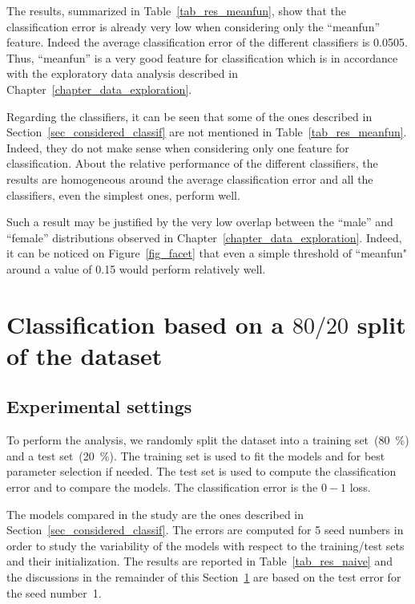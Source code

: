 The results, summarized in Table~\ref{tab_res_meanfun}, show that the classification error is already very low when considering only the ``meanfun'' feature. Indeed the average classification error of the different classifiers is \num{0.0505}. Thus, ``meanfun'' is a very good feature for classification which is in accordance with the exploratory data analysis described in Chapter~\ref{chapter_data_exploration}. 

Regarding the classifiers, it can be seen that some of the ones described in Section~\ref{sec_considered_classif} are not mentioned in Table~\ref{tab_res_meanfun}. Indeed, they do not make sense when considering only one feature for classification. 
About the relative performance of the different classifiers, the results are homogeneous around the average classification error and all the classifiers, even the simplest ones, perform well.

Such a result may be justified by the very low overlap between the ``male'' and ``female'' distributions observed in Chapter~\ref{chapter_data_exploration}. Indeed, it can be noticed on Figure~\ref{fig_facet} that even a simple threshold of ``meanfun" around a value of \num{0.15} would perform relatively well. 

\section{Classification based on a $80/20$ split of the dataset}
\label{sec_naive_strat}

\subsection{Experimental settings}
To perform the analysis, we randomly split the dataset into a training set~(\SI{80}{\percent}) and a test set~(\SI{20}{\percent}). 
The training set is used to fit the models and for best parameter selection if needed. 
The test set is used to compute the classification error and to compare the models. The classification error is the $0-1$ loss. 

The models compared in the study are the ones described in Section~\ref{sec_considered_classif}. 
The errors are computed for \num{5} seed numbers in order to study the variability of the models with respect to the training/test sets and their initialization. 
The results are reported in Table~\ref{tab_res_naive} and the discussions in the remainder of this Section~\ref{sec_naive_strat} are based on the test error for the seed number~\num{1}.

